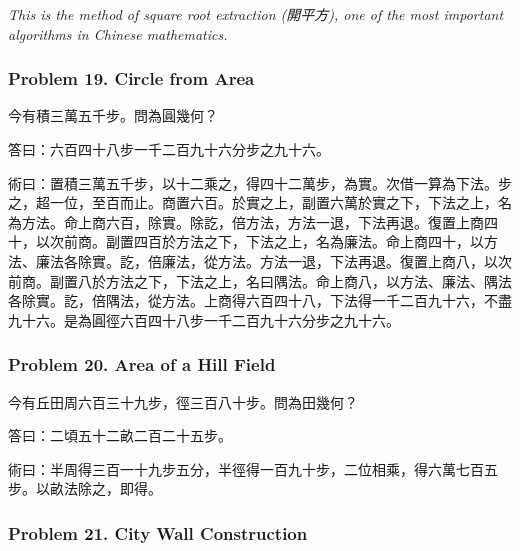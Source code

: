 \documentclass[11pt,a4paper]{article}
\newcommand{\zh}[1]{{\CJKfamily{}#1}}
\begin{document}
\textit{This is the method of square root extraction (\zh{開平方}), one of the most important algorithms in Chinese mathematics.}

\subsubsection*{Problem 19. Circle from Area}

\begin{problembox}[title=\zh{問}]
\zh{今有積三萬五千步。問為圓幾何？}
\end{problembox}
\begin{answerbox}[title=\zh{答}]
\zh{答曰：六百四十八步一千二百九十六分步之九十六。}
\end{answerbox}
\begin{methodbox}[title=\zh{術}]
\zh{術曰：置積三萬五千步，以十二乘之，得四十二萬步，為實。次借一算為下法。步之，超一位，至百而止。商置六百。於實之上，副置六萬於實之下，下法之上，名為方法。命上商六百，除實。除訖，倍方法，方法一退，下法再退。復置上商四十，以次前商。副置四百於方法之下，下法之上，名為廉法。命上商四十，以方法、廉法各除實。訖，倍廉法，從方法。方法一退，下法再退。復置上商八，以次前商。副置八於方法之下，下法之上，名曰隅法。命上商八，以方法、廉法、隅法各除實。訖，倍隅法，從方法。上商得六百四十八，下法得一千二百九十六，不盡九十六。是為圓徑六百四十八步一千二百九十六分步之九十六。}
\end{methodbox}

\subsubsection*{Problem 20. Area of a Hill Field}

\begin{problembox}[title=\zh{問}]
\zh{今有丘田周六百三十九步，徑三百八十步。問為田幾何？}
\end{problembox}
\begin{answerbox}[title=\zh{答}]
\zh{答曰：二頃五十二畝二百二十五步。}
\end{answerbox}
\begin{methodbox}[title=\zh{術}]
\zh{術曰：半周得三百一十九步五分，半徑得一百九十步，二位相乘，得六萬七百五步。以畝法除之，即得。}
\end{methodbox}

\subsubsection*{Problem 21. City Wall Construction}
\end{document}
